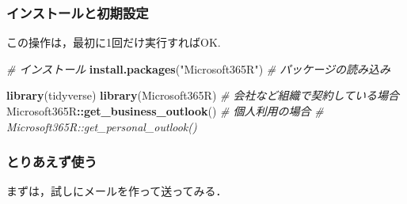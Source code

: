 \documentclass[
]{article}
\newenvironment{Shaded}{\begin{snugshade}}{\end{snugshade}}
\newcommand{\CommentTok}[1]{\textcolor[rgb]{0.56,0.35,0.01}{\textit{#1}}}
\newcommand{\FunctionTok}[1]{\textcolor[rgb]{0.13,0.29,0.53}{\textbf{#1}}}
\newcommand{\NormalTok}[1]{#1}
\newcommand{\SpecialCharTok}[1]{\textcolor[rgb]{0.81,0.36,0.00}{\textbf{#1}}}
\newcommand{\StringTok}[1]{\textcolor[rgb]{0.31,0.60,0.02}{#1}}
\begin{document}
\hypertarget{ux30a4ux30f3ux30b9ux30c8ux30fcux30ebux3068ux521dux671fux8a2dux5b9a}{%
\subsubsection{インストールと初期設定}\label{ux30a4ux30f3ux30b9ux30c8ux30fcux30ebux3068ux521dux671fux8a2dux5b9a}}

この操作は，最初に1回だけ実行すればOK.

\begin{Shaded}
\begin{Highlighting}[]
  \CommentTok{\# インストール}
\FunctionTok{install.packages}\NormalTok{(}\StringTok{"Microsoft365R"}\NormalTok{)}
  \CommentTok{\# パッケージの読み込み}
\end{Highlighting}
\end{Shaded}

\begin{Shaded}
\begin{Highlighting}[]
\FunctionTok{library}\NormalTok{(tidyverse)}
\FunctionTok{library}\NormalTok{(Microsoft365R)}
 \CommentTok{\# 会社など組織で契約している場合}
\NormalTok{Microsoft365R}\SpecialCharTok{::}\FunctionTok{get\_business\_outlook}\NormalTok{()}
 \CommentTok{\# 個人利用の場合}
  \CommentTok{\# Microsoft365R::get\_personal\_outlook()}
\end{Highlighting}
\end{Shaded}

\hypertarget{ux3068ux308aux3042ux3048ux305aux4f7fux3046}{%
\subsubsection{とりあえず使う}\label{ux3068ux308aux3042ux3048ux305aux4f7fux3046}}

まずは，試しにメールを作って送ってみる．
\end{document}
